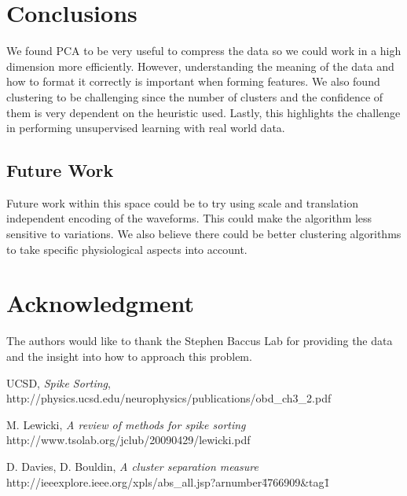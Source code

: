 \documentclass[conference]{IEEEtran}
\begin{document}
\section{Conclusions}
We found PCA to be very useful to compress the data so we could work
in a high dimension more efficiently. However, understanding the
meaning of the data and how to format it correctly is important when
forming features. We also found clustering to be challenging since the
number of clusters and the confidence of them is very dependent on the
heuristic used.  Lastly, this highlights the challenge in performing
unsupervised learning with real world data.

\subsection{Future Work}
Future work within this space could be to try using scale and
translation independent encoding of the waveforms. This could make the
algorithm less sensitive to variations.  We also believe there could
be better clustering algorithms to take specific physiological 
aspects into account.


\section*{Acknowledgment}
The authors would like to thank the Stephen Baccus Lab for providing
the data and the insight into how to approach this problem.


\begin{thebibliography}{1}


UCSD, \emph{Spike Sorting},
http://physics.ucsd.edu/neurophysics/publications/obd\_ch3\_2.pdf

M. Lewicki, \emph{A review of methods for spike sorting}
http://www.tsolab.org/jclub/20090429/lewicki.pdf

D. Davies, D. Bouldin, \emph{A cluster separation measure}
http://ieeexplore.ieee.org/xpls/abs\_all.jsp?arnumber\=4766909\&tag\=1


\end{thebibliography}
\end{document}
